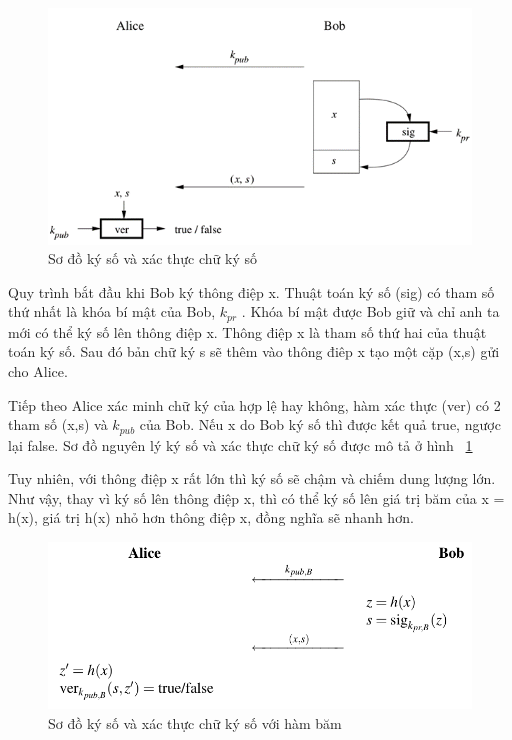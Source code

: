 \begin{figure}[htbp]
\centering
\includegraphics[width=.9\linewidth]{img/dig_sig.png}
\caption{Sơ đồ ký số và xác thực chữ ký số}
\label{fig:dig_sig}
\end{figure}

Quy trình bắt đầu khi Bob ký thông điệp x. Thuật toán ký số (sig) có tham số thứ nhất là khóa bí mật của Bob, $k_{pr}$ . Khóa bí mật được Bob giữ và chỉ anh ta mới có thể ký số lên thông điệp x. Thông điệp x là tham số thứ hai của thuật toán ký số. Sau đó bản chữ ký s sẽ thêm vào thông điêp x tạo một cặp (x,s) gửi cho Alice.
 
Tiếp theo Alice xác minh chữ ký của hợp lệ hay không, hàm xác thực (ver) có 2 tham số (x,s) và $k_{pub}$  của Bob. Nếu x do Bob ký số thì được kết quả true, ngược lại false.
Sơ đồ nguyên lý ký số và xác thực chữ ký số được mô tả ở hình ~\ref{fig:dig_sig}

Tuy nhiên, với thông điệp x rất lớn thì ký số sẽ chậm và chiếm dung lượng lớn. Như vậy, thay vì ký số lên thông điệp x, thì có thể ký số lên giá trị băm của x = h(x), giá trị h(x) nhỏ hơn thông điệp x, đồng nghĩa sẽ nhanh hơn. 

\begin{figure}[htbp]
\centering
\includegraphics[width=.9\linewidth]{img/dig_sig_hash.png}
\caption{Sơ đồ ký số và xác thực chữ ký số với hàm băm}
\label{fig:dig_sig_hash}
\end{figure}

